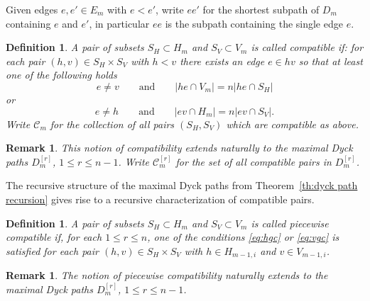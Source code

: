 \documentclass{amsart}
\newtheorem{definition}[theorem]{Definition}
\newtheorem{remark}[theorem]{Remark}
\numberwithin{equation}{section}
\newcommand{\cC}{\mathcal{C}}
\begin{document}
Given edges $e,e'\in E_m$ with $e<e'$, write $ee'$ for the shortest subpath of $D_m$ containing $e$ and $e'$, in particular $ee$ is the subpath containing the single edge $e$.
\begin{definition}
  \label{def:compatibility}
  A pair of subsets $S_H\subset H_m$ and $S_V\subset V_m$ is called \emph{compatible} if: 
  for each pair $(h,v)\in S_H\times S_V$ with $h<v$ there exists an edge $e\in hv$ so that at least one of the following holds
  \begin{equation}
    \label{eq:hgc}
    e\ne v\qquad\text{and}\qquad |he\cap V_m|=n|he\cap S_H|
  \end{equation}
  or
  \begin{equation}
    \label{eq:vgc}
    e\ne h\qquad\text{and}\qquad |ev\cap H_m|=n|ev\cap S_V|.
  \end{equation}
  Write $\cC_m$ for the collection of all pairs $(S_H,S_V)$ which are compatible as above.
\end{definition}
\begin{remark}
  This notion of compatibility extends naturally to the maximal Dyck paths $D_m^{[r]}$, $1\le r\le n-1$.  Write $\cC_m^{[r]}$ for the set of all compatible pairs in $D_m^{[r]}$.
\end{remark}

The recursive structure of the maximal Dyck paths from Theorem~\ref{th:dyck path recursion} gives rise to a recursive characterization of compatible pairs.
\begin{definition}
  \cite[Definition 3.11]{rupel}
  \label{def:piecewise compatibility}
  A pair of subsets $S_H\subset H_m$ and $S_V\subset V_m$ is called \emph{piecewise compatible} if, for each $1\le r\le n$, one of the conditions \eqref{eq:hgc} or \eqref{eq:vgc} is satisfied for each pair $(h,v)\in S_H\times S_V$ with $h\in H_{m-1,i}$ and $v\in V_{m-1,i}$.
\end{definition}
\begin{remark}
  The notion of piecewise compatibility naturally extends to the maximal Dyck paths $D_m^{[r]}$, $1\le r\le n-1$.
\end{remark}
\end{document}
